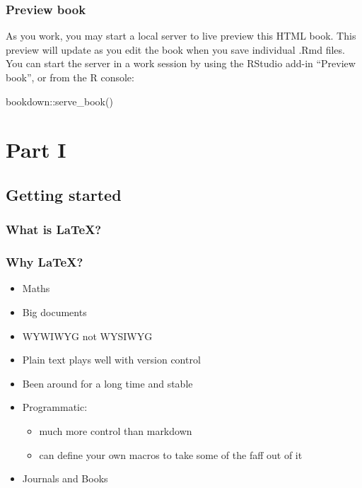 \documentclass[
]{book}
\newenvironment{Shaded}{\begin{snugshade}}{\end{snugshade}}
\newcommand{\FunctionTok}[1]{\textcolor[rgb]{0.00,0.00,0.00}{#1}}
\newcommand{\NormalTok}[1]{#1}
\newcommand{\SpecialCharTok}[1]{\textcolor[rgb]{0.00,0.00,0.00}{#1}}
\providecommand{\tightlist}{%
  \setlength{\itemsep}{0pt}\setlength{\parskip}{0pt}}
\begin{document}
\hypertarget{preview-book}{%
\section{Preview book}\label{preview-book}}

As you work, you may start a local server to live preview this HTML book. This preview will update as you edit the book when you save individual .Rmd files. You can start the server in a work session by using the RStudio add-in ``Preview book'', or from the R console:

\begin{Shaded}
\begin{Highlighting}[]
\NormalTok{bookdown}\SpecialCharTok{::}\FunctionTok{serve\_book}\NormalTok{()}
\end{Highlighting}
\end{Shaded}

\hypertarget{part-part-i}{%
\part{Part I}\label{part-part-i}}

\hypertarget{getting-started}{%
\chapter{Getting started}\label{getting-started}}

\hypertarget{what-is-latex}{%
\section{What is LaTeX?}\label{what-is-latex}}

\hypertarget{why-latex}{%
\section{Why LaTeX?}\label{why-latex}}

\begin{itemize}
\tightlist
\item
  Maths
\item
  Big documents
\item
  WYWIWYG not WYSIWYG
\item
  Plain text plays well with version control
\item
  Been around for a long time and stable
\item
  Programmatic:

  \begin{itemize}
  \tightlist
  \item
    much more control than markdown
  \item
    can define your own macros to take some of the faff out of it
  \end{itemize}
\item
  Journals and Books
\end{itemize}
\end{document}
